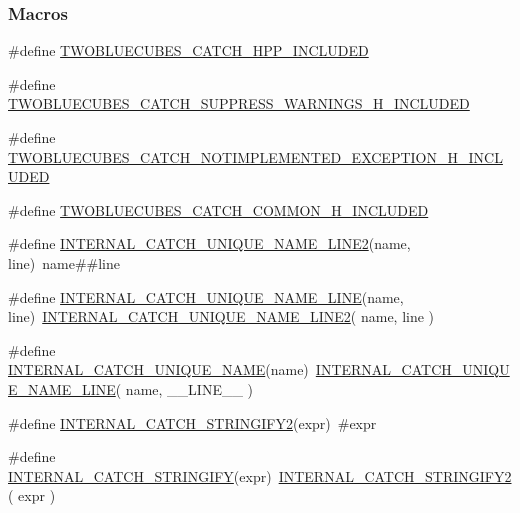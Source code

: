 \subsubsection*{Macros}
\begin{DoxyCompactItemize}
\item 
\#define \hyperlink{a00094_a24243dc93e4f452db07fb6514bb9e749}{T\+W\+O\+B\+L\+U\+E\+C\+U\+B\+E\+S\+\_\+\+C\+A\+T\+C\+H\+\_\+\+H\+P\+P\+\_\+\+I\+N\+C\+L\+U\+D\+E\+D}
\item 
\#define \hyperlink{a00094_a5eead7e2b722a8372e8a09843f099634}{T\+W\+O\+B\+L\+U\+E\+C\+U\+B\+E\+S\+\_\+\+C\+A\+T\+C\+H\+\_\+\+S\+U\+P\+P\+R\+E\+S\+S\+\_\+\+W\+A\+R\+N\+I\+N\+G\+S\+\_\+\+H\+\_\+\+I\+N\+C\+L\+U\+D\+E\+D}
\item 
\#define \hyperlink{a00094_a62f025f954221470c23a77e90ffacd56}{T\+W\+O\+B\+L\+U\+E\+C\+U\+B\+E\+S\+\_\+\+C\+A\+T\+C\+H\+\_\+\+N\+O\+T\+I\+M\+P\+L\+E\+M\+E\+N\+T\+E\+D\+\_\+\+E\+X\+C\+E\+P\+T\+I\+O\+N\+\_\+\+H\+\_\+\+I\+N\+C\+L\+U\+D\+E\+D}
\item 
\#define \hyperlink{a00094_a27b42830f93b62d65bd7c15fb3acd0d0}{T\+W\+O\+B\+L\+U\+E\+C\+U\+B\+E\+S\+\_\+\+C\+A\+T\+C\+H\+\_\+\+C\+O\+M\+M\+O\+N\+\_\+\+H\+\_\+\+I\+N\+C\+L\+U\+D\+E\+D}
\item 
\#define \hyperlink{a00094_a7c21e89d8b7727757ce9ca2b848f1cda}{I\+N\+T\+E\+R\+N\+A\+L\+\_\+\+C\+A\+T\+C\+H\+\_\+\+U\+N\+I\+Q\+U\+E\+\_\+\+N\+A\+M\+E\+\_\+\+L\+I\+N\+E2}(name,  line)~name\#\#line
\item 
\#define \hyperlink{a00094_a1b51a086ea21a750bd306ac0ed4d2a95}{I\+N\+T\+E\+R\+N\+A\+L\+\_\+\+C\+A\+T\+C\+H\+\_\+\+U\+N\+I\+Q\+U\+E\+\_\+\+N\+A\+M\+E\+\_\+\+L\+I\+N\+E}(name,  line)~\hyperlink{a00094_a7c21e89d8b7727757ce9ca2b848f1cda}{I\+N\+T\+E\+R\+N\+A\+L\+\_\+\+C\+A\+T\+C\+H\+\_\+\+U\+N\+I\+Q\+U\+E\+\_\+\+N\+A\+M\+E\+\_\+\+L\+I\+N\+E2}( name, line )
\item 
\#define \hyperlink{a00094_afe320ceec108fc8c160f9ac3938f1bc8}{I\+N\+T\+E\+R\+N\+A\+L\+\_\+\+C\+A\+T\+C\+H\+\_\+\+U\+N\+I\+Q\+U\+E\+\_\+\+N\+A\+M\+E}(name)~\hyperlink{a00094_a1b51a086ea21a750bd306ac0ed4d2a95}{I\+N\+T\+E\+R\+N\+A\+L\+\_\+\+C\+A\+T\+C\+H\+\_\+\+U\+N\+I\+Q\+U\+E\+\_\+\+N\+A\+M\+E\+\_\+\+L\+I\+N\+E}( name, \+\_\+\+\_\+\+L\+I\+N\+E\+\_\+\+\_\+ )
\item 
\#define \hyperlink{a00094_af5d658c0f6223019fd91fda2dc8bff78}{I\+N\+T\+E\+R\+N\+A\+L\+\_\+\+C\+A\+T\+C\+H\+\_\+\+S\+T\+R\+I\+N\+G\+I\+F\+Y2}(expr)~\#expr
\item 
\#define \hyperlink{a00094_ae5403b344db1b68faf372ad1dbcb5791}{I\+N\+T\+E\+R\+N\+A\+L\+\_\+\+C\+A\+T\+C\+H\+\_\+\+S\+T\+R\+I\+N\+G\+I\+F\+Y}(expr)~\hyperlink{a00094_af5d658c0f6223019fd91fda2dc8bff78}{I\+N\+T\+E\+R\+N\+A\+L\+\_\+\+C\+A\+T\+C\+H\+\_\+\+S\+T\+R\+I\+N\+G\+I\+F\+Y2}( expr )

\end{DoxyCompactItemize}
